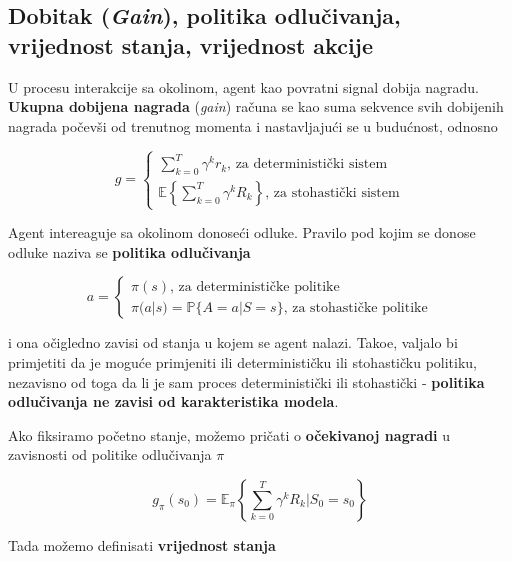 \documentclass[12pt]{IEEEtran}
\numberwithin{equation}{subsection}
\numberwithin{figure}{subsection}
\theoremstyle{definition}
\numberwithin{example}{section}
\begin{document}
\subsection{\textbf{Dobitak} (\textit{Gain}), \textbf{politika odlu\v{c}ivanja, vrijednost stanja, vrijednost akcije}}

U procesu interakcije sa okolinom, agent kao povratni signal dobija nagradu.
\textbf{Ukupna dobijena nagrada} (\textit{gain}) ra\v{c}una se kao suma sekvence svih
dobijenih nagrada po\v{c}ev\v{s}i od trenutnog momenta i
nastavljaju\'{c}i se u budu\'{c}nost, odnosno

\begin{equation}
    g = \begin{cases}
        \sum_{k = 0}^{T}{\gamma^{k}r_{k}} \text{, za deterministi\v{c}ki sistem} \\
        \mathbb{E}\left\{\sum_{k = 0}^{T}{\gamma^{k}R_{k}}\right\} \text{, za stohasti\v{c}ki sistem}
    \end{cases}
\end{equation}

Agent intereaguje sa okolinom donose\'{c}i odluke. Pravilo
pod kojim se donose odluke naziva se \textbf{politika odlu\v{c}ivanja}

\begin{equation}
    a = \begin{cases}
        \pi(s) \text{, za deterministi\v{c}ke politike} \\
        \pi(a | s) = \mathbb{P}\{A = a | S = s\} \text{, za stohasti\v{c}ke politike}
    \end{cases}
\end{equation}

i ona o\v{c}igledno zavisi od stanja u kojem se agent nalazi.
Tako\dj{}e, valjalo bi primjetiti da je mogu\'{c}e primjeniti ili deterministi\v{c}ku ili
stohasti\v{c}ku politiku, nezavisno od toga da li je sam proces
deterministi\v{c}ki ili stohasti\v{c}ki - \textbf{politika odlu\v{c}ivanja
ne zavisi od karakteristika modela}.

Ako fiksiramo po\v{c}etno stanje, mo\v{z}emo pri\v{c}ati o
\textbf{o\v{c}ekivanoj nagradi} u zavisnosti od politike
odlu\v{c}ivanja $\pi$

\begin{equation}
    g_{\pi}(s_{0}) = \mathbb{E}_{\pi}\left\{\sum_{k = 0}^{T}{\gamma^{k}R_{k}} | S_{0} = s_{0}\right\}
\end{equation}

Tada mo\v{z}emo definisati \textbf{vrijednost stanja}
\end{document}
